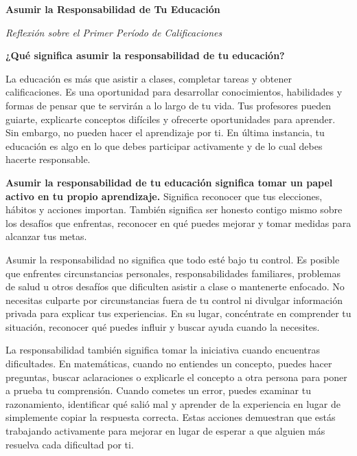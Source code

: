 \documentclass[10pt]{article}
\title{}
\date{}
\begin{document}

\begin{center}
    {\Large\bfseries Asumir la Responsabilidad de Tu Educación}

    \vspace{2pt}
    {\small\itshape Reflexión sobre el Primer Período de Calificaciones}
\end{center}

\textbf{¿Qué significa asumir la responsabilidad de tu educación?}

La educación es más que asistir a clases, completar tareas y
obtener calificaciones. Es una oportunidad para desarrollar conocimientos,
habilidades y formas de pensar que te servirán a lo largo de tu
vida. Tus profesores pueden guiarte, explicarte conceptos difíciles
y ofrecerte oportunidades para aprender. Sin embargo, no pueden hacer
el aprendizaje por ti. En última instancia, tu educación es algo en
lo que debes participar activamente y de lo cual debes hacerte responsable.

\textbf{Asumir la responsabilidad de tu educación significa tomar un papel
activo en tu propio aprendizaje.} Significa reconocer que tus elecciones,
hábitos y acciones importan. También significa ser honesto contigo mismo
sobre los desafíos que enfrentas, reconocer en qué puedes mejorar y
tomar medidas para alcanzar tus metas.

Asumir la responsabilidad no significa que todo esté bajo tu
control. Es posible que enfrentes circunstancias personales, responsabilidades
familiares, problemas de salud u otros desafíos que dificulten asistir
a clase o mantenerte enfocado. No necesitas culparte por circunstancias
fuera de tu control ni divulgar información privada para explicar tus
experiencias. En su lugar, concéntrate en comprender tu situación,
reconocer qué puedes influir y buscar ayuda cuando la necesites.

La responsabilidad también significa tomar la iniciativa cuando encuentras
dificultades. En matemáticas, cuando no entiendes un concepto, puedes
hacer preguntas, buscar aclaraciones o explicarle el concepto a otra
persona para poner a prueba tu comprensión. Cuando cometes un error,
puedes examinar tu razonamiento, identificar qué salió mal y aprender
de la experiencia en lugar de simplemente copiar la respuesta correcta.
Estas acciones demuestran que estás trabajando activamente para mejorar
en lugar de esperar a que alguien más resuelva cada dificultad por ti.
\end{document}
